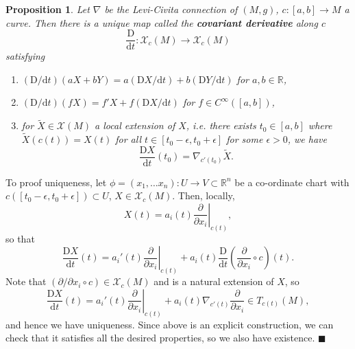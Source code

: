 \documentclass[letter-paper]{tufte-book}
\newtheorem{proposition}[theorem]{\color{pastel-blue}Proposition}
\newenvironment{proof}[1][Proof]{\begin{trivlist}
\item[\hskip \labelsep {\bfseries #1}]}{\end{trivlist}}
\newcommand{\qed}{\hfill$\blacksquare$}
\begin{document}
\begin{proposition}
  Let $\nabla$ be the Levi-Civita connection of $(M,g)$, $c:[a,b] \to M$ a curve. Then there is a unique map called the \textbf{covariant derivative} along $c$
  \begin{equation}
    \frac{\mathrm{D}}{\mathrm{d}t} : \mathcal{X}_c(M) \to \mathcal{X}_c(M)
  \end{equation}
  satisfying
  \begin{enumerate}
    \item $(\mathrm{D} / \mathrm{d}t) (aX + bY) = a (\mathrm{D}X / \mathrm{d}t) + b (\mathrm{D}Y / \mathrm{d}t)$ for $a,b\in \mathbb{R}$,
    \item $(\mathrm{D} / \mathrm{d}t) (fX) = f'X + f (\mathrm{D}X / \mathrm{d}t)$ for $f\in C^\infty([a,b])$,
    \item for $\tilde{X} \in \mathcal{X}(M)$ a local extension of $X$, i.e. there exists $t_0 \in[a,b]$ where $\tilde{X}(c(t)) = X(t)$ for all $t \in [t_0 - \epsilon, t_0 + \epsilon]$ for some $\epsilon > 0$, we have
    \begin{equation}
      \frac{\mathrm{D}X}{\mathrm{d}t}(t_0) = \nabla_{c'(t_0)} \tilde{X}.
    \end{equation}
  \end{enumerate}
\end{proposition}

\begin{proof}
  To proof uniqueness, let $\phi = (x_1, \ldots x_n) : U \to V \subset \mathbb{R}^n$ be a co-ordinate chart with $c([t_0 - \epsilon, t_0 + \epsilon]) \subset U$, $X \in \mathcal{X}_c(M)$. Then, locally,
  \begin{equation*}
    X(t) = a_i(t) \left.\frac{\partial}{\partial x_i}\right|_{c(t)},
  \end{equation*}
  so that
  \begin{equation*}
    \frac{\mathrm{D}X}{\mathrm{d}t}(t) = a_i'(t) \left.\frac{\partial}{\partial x_i}\right|_{c(t)} + a_i(t) \frac{\mathrm{D}}{\mathrm{d}t}\left(\frac{\partial}{\partial x_i} \circ c\right)(t).
  \end{equation*}
  Note that $(\partial / \partial x_i \circ c) \in \mathcal{X}_c(M)$ and is a natural extension of $X$, so
  \begin{equation*}
    \frac{\mathrm{D}X}{\mathrm{d}t}(t) = a_i'(t) \left.\frac{\partial}{\partial x_i}\right|_{c(t)} + a_i(t) \nabla_{c'(t)} \frac{\partial}{\partial x_i} \in T_{c(t)}(M),
  \end{equation*}
  and hence we have uniqueness. Since above is an explicit construction, we can check that it satisfies all the desired properties, so we also have existence. \qed
\end{proof}
\end{document}

